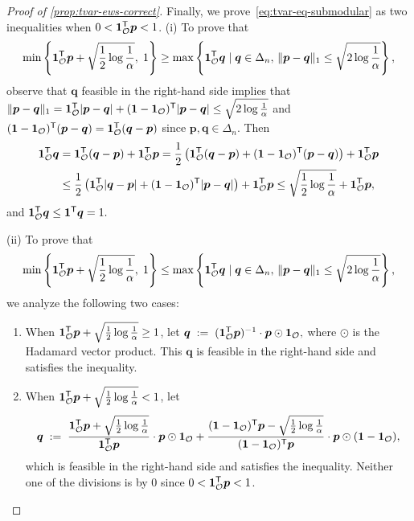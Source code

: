 \begin{proof}[Proof of \cref{prop:tvar-ews-correct}]
Finally, we prove~\eqref{eq:tvar-eq-submodular} as two inequalities when $0 < \bm{1}_{\mathcal{O}}^{\mathsf{T}} \bm{p} < 1$. 
(i) To prove that 
\[
  \min\left\{ \bm{1}_{\mathcal{O}}^{\mathsf{T}} \bm{p} + \sqrt{\frac{1}{2} \log \frac{1}{\alpha}},\; 1 \right\}
  \ge \max \left\{ \bm{1}_{\mathcal{O}}^{\mathsf{T}} \bm{q} \mid
\bm{q} \in \Delta_n, \,
\|\bm{p} -\bm{q}\|_1 \le \sqrt{2 \log \frac{1}{\alpha}}
\right\},
\]
observe that $\bm{q}$ feasible in the right-hand side implies that \(  \|\bm{p} - \bm{q}\|_1 = \bm{1}_{\mathcal{O}}^{\mathsf{T}} |\bm{p} - \bm{q}| + (\bm{1} - \bm{1}_{\mathcal{O}})^{\mathsf{T}} |\bm{p} - \bm{q}|
  \leq \sqrt{2 \log \frac{1}{\alpha }} \) and $(\bm{1} - \bm{1}_{\mathcal{O}})^{\mathsf{T}} (\bm{p} - \bm{q}) = \bm{1}_{\mathcal{O}}^{\mathsf{T}}  (\bm{q} - \bm{p})$ since $\bm{p},\bm{q}\in \Delta_n$.  Then
\begin{align*}
  \bm{1}_{\mathcal{O}}^{\mathsf{T}} \bm{q}
  &= \bm{1}_{\mathcal{O}}^{\mathsf{T}} (\bm{q} - \bm{p}) + \bm{1}_{\mathcal{O}}^{\mathsf{T}}  \bm{p} 
  = \frac{1}{2}\left(  \bm{1}_{\mathcal{O}}^{\mathsf{T}} (\bm{q} - \bm{p})  + (\bm{1} - \bm{1}_{\mathcal{O}})^{\mathsf{T}}  (\bm{p} - \bm{q}) \right)+ \bm{1}_{\mathcal{O}}^{\mathsf{T}}  \bm{p} \\
  &\le \frac{1}{2}\left(  \bm{1}_{\mathcal{O}}^{\mathsf{T}} |\bm{q} - \bm{p}|  + (\bm{1} - \bm{1}_{\mathcal{O}})^{\mathsf{T}} |\bm{p} - \bm{q}| \right)+ \bm{1}_{\mathcal{O}}^{\mathsf{T}}  \bm{p} 
  \le \sqrt{\frac{1}{2} \log \frac{1}{\alpha }} + \bm{1}_{\mathcal{O}}^{\mathsf{T}}  \bm{p},
\end{align*}
and  \(  \bm{1}_{\mathcal{O}}^{\mathsf{T}} \bm{q} \leq \bm{1}^{\mathsf{T}} \bm{q}  = 1.\)


(ii) To prove that 
\[
  \min\left\{ \bm{1}_{\mathcal{O}}^{\mathsf{T}} \bm{p} + \sqrt{\frac{1}{2} \log \frac{1}{\alpha }},\; 1 \right\}
\le \max \left\{ \bm{1}_{\mathcal{O}}^{\mathsf{T}} \bm{q} \mid 
\bm{q} \in \Delta_n, \,
\|\bm{p} -\bm{q}\|_{1} \le  \sqrt{2 \log \frac{1}{\alpha }}
\right\},
\]
we analyze the following two cases:
\begin{enumerate}[nosep]
\item[(a)] When $\bm{1}_{\mathcal{O}}^{\mathsf{T}}  \bm{p} +  \sqrt{\frac{1}{2} \log \frac{1}{\alpha }} \ge 1$, let \(\bm{q} \;:=\;  (\bm{1}_{\mathcal{O}}^{\mathsf{T}} \bm{p})^{-1} \cdot \bm{p} \odot \bm{1}_{\mathcal{O}}, \)
  where $\odot$ is the Hadamard vector product. This $\bm{q}$ is feasible in the right-hand side and satisfies the inequality. 
\item[(b)] When $\bm{1}_{\mathcal{O}}^{\mathsf{T}}  \bm{p}  + \sqrt{\frac{1}{2} \log \frac{1}{\alpha }}< 1$, let 
\[
\bm{q} \;:=\; \frac{\bm{1}_{\mathcal{O}}^{\mathsf{T}} \bm{p} + \sqrt{\frac{1}{2} \log \frac{1}{\alpha }}}{\bm{1}_{\mathcal{O}}^{\mathsf{T}} \bm{p}} \cdot \bm{p} \odot \bm{1}_{\mathcal{O}}
+  \frac{(\bm{1} - \bm{1}_{\mathcal{O}}) ^{\mathsf{T}} \bm{p} - \sqrt{\frac{1}{2} \log \frac{1}{\alpha }} }{(\bm{1} - \bm{1}_{\mathcal{O}}) ^{\mathsf{T}} \bm{p}}\cdot \bm{p} \odot (\bm{1} - \bm{1}_{\mathcal{O}}),
\]
which is feasible in the right-hand side and satisfies the inequality. Neither one of the divisions is by $0$ since $0 < \bm{1}_{\mathcal{O}}^{\mathsf{T}} \bm{p} < 1$.
\end{enumerate}
\end{proof}

